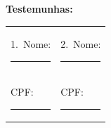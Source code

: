 \documentclass[11pt, a4paper]{article}
\begin{document}
\vspace{1.2cm}

\textbf{Testemunhas:}

\vspace{1cm}

\begin{tabular}{p{} p{}}
    1.\ Nome: \rule{5.5cm}{0.5pt} & 2.\ Nome: \rule{5.5cm}{0.5pt} \\[0.6cm]
    \hspace{0.35cm} CPF: \rule{5.5cm}{0.5pt} & \hspace{0.35cm} CPF: \rule{5.5cm}{0.5pt} \\
\end{tabular}
\end{document}
